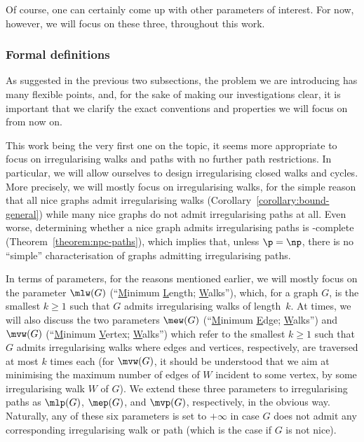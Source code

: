 \documentclass[a4paper,11pt,dvipsnames]{elsarticle}
\newcommand{\sam}[1]{\todo[size=\tiny,color=red!20!white]{\textbf{Sam:} #1}}
\newcommand{\sam}[1]{}
\begin{document}
\noindent Of course, one can certainly come up with other parameters of interest.
For now, however, we will focus on these three, throughout this work.

\subsubsection{Formal definitions}

As suggested in the previous two subsections, the problem we are introducing has many flexible points,
and, for the sake of making our investigations clear, it is important that we clarify the exact conventions and properties
we will focus on from now on.

This work being the very first one on the topic,
it seems more appropriate to focus on irregularising walks and paths with no further path restrictions.
In particular, we will allow ourselves to design irregularising closed walks and cycles.
More precisely, we will mostly focus on irregularising walks, for the simple reason that all nice graphs admit irregularising walks (Corollary~\ref{corollary:bound-general})
while many nice graphs do not admit irregularising paths at all. Even worse, determining whether a nice graph admits irregularising paths is \np-complete (Theorem~\ref{theorem:npc-paths}),
which implies that, unless $\p = \np$, there is no ``simple'' characterisation of graphs admitting irregularising paths.

In terms of parameters, for the reasons mentioned earlier, we will mostly focus on the parameter $\mlw(G)$ (``\underline{M}inimum \underline{L}ength; \underline{W}alks''),
which, for a graph $G$, is the smallest $k \geq 1$ such that $G$ admits irregularising walks of length~$k$.
At times, we will also discuss the two parameters $\mew(G)$ (``\underline{M}inimum \underline{E}dge; \underline{W}alks'') and
$\mvw(G)$ (``\underline{M}inimum \underline{V}ertex; \underline{W}alks'') which refer to the smallest $k \geq 1$ such that $G$ admits irregularising walks
where edges and vertices, respectively, are traversed at most $k$ times each (for $\mvw(G)$, it should be understood that we aim at minimising the maximum number of edges of $W$ incident to some vertex, 
by some irregularising walk $W$ of $G$).
We extend these three parameters to irregularising paths as $\mlp(G)$, $\mep(G)$, and $\mvp(G)$, respectively,
in the obvious way.
Naturally, any of these six parameters is set to $+\infty$ in case $G$ does not admit any corresponding irregularising walk or path (which is the case if $G$ is not nice).
\end{document}
